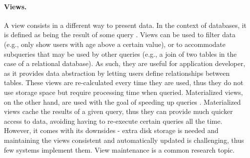 \paragraph{Views.}
A view consists in a different way to present data.
In the context of databases, it is defined as being the result of some query \cite{txcache}. %
Views can be used to filter data (e.g., only show users with age above a certain value), or to accommodate subqueries that may be used by other queries (e.g., a join of two tables in the case of a relational database).
As such, they are useful for application developer, as it provides data abstraction by letting users define relationships between tables.
These views are re-calculated every time they are used, thus they do not use storage space but require processing time when queried.
Materialized views, on the other hand, are used with the goal of speeding up queries \cite{noria, pequod, txcache, partView, viewSelection, incMaintenance, effMaintenance, lazyMaintenance}. %
Materialized views cache the results of a given query, thus they can provide much quicker access to data, avoiding having to re-execute certain queries all the time.
However, it comes with its downsides - extra disk storage is needed and maintaining the views consistent and automatically updated is challenging, thus few systems implement them.
View maintenance is a common research topic. 


